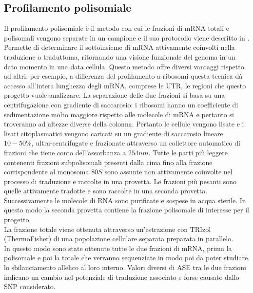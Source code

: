 \subsection{Profilamento polisomiale}
Il profilamento polisomiale \`e il metodo con cui le frazioni di mRNA totali e polisomali vengono separate in un campione e il suo protocollo viene descritto in \cite{polprofiling}.
Permette di determinare il sottoinsieme di mRNA attivamente coinvolti nella traduzione o traduttoma, ritornando una visione funzionale del genoma in un dato momento in una data cellula.
Questo metodo offre diversi vantaggi rispetto ad altri, per esempio, a differenza del profilamento a ribosomi questa tecnica d\`a accesso all'intera lunghezza degli mRNA, comprese le UTR, le regioni che questo progetto vuole analizzare.
La separazione delle due frazioni si basa su una centrifugazione con gradiente di saccarosio: i ribosomi hanno un coefficiente di sedimentazione molto maggiore rispetto alle molecole di mRNA e pertanto si troveranno ad altezze diverse della colonna.
Pertanto le cellule vengono lisate e i lisati citoplasmatici vengono caricati su un gradiente di saccarosio lineare $10-50\%$, ultra-centrifugate e frazionate attraverso un collettore automatico di frazioni che tiene conto dell'assorbanza a $254nm$.
Tutte le parti pi\`u leggere contenenti frazioni subpolisomali presenti dalla cima fino alla frazione corrispondente al monosoma $80S$ sono assunte non attivamente coinvolte nel processo di traduzione e raccolte in una provetta.
Le frazioni pi\`u pesanti sono quelle attivamente tradotte e sono raccolte in una seconda provetta.
Successivamente le molecole di RNA sono purificate e sospese in acqua sterile.
In questo modo la seconda provetta contiene la frazione polisomale di interesse per il progetto.\\
La frazione totale viene ottenuta attraverso un'estrazione con TRIzol (ThermoFisher) di una popolazione cellulare separata preparata in parallelo.\\
In questo modo sono state ottenute tutte le due frazioni di mRNA, prima la polisomale e poi la totale che verranno sequenziate in modo poi da poter studiare lo sbilanciamento allelico al loro interno.
Valori diversi di ASE tra le due frazioni indicano un cambio nel potenziale di traduzione associato e forse causato dallo SNP considerato.


